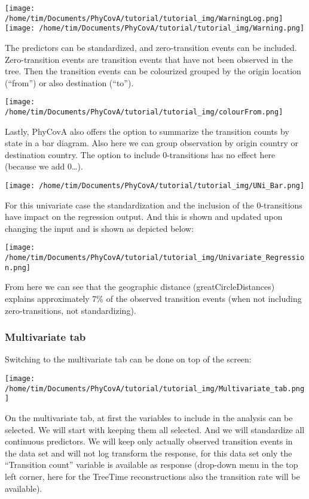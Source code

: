 \documentclass[
]{article}
\begin{document}
\texttt{[image: /home/tim/Documents/PhyCovA/tutorial/tutorial\_img/WarningLog.png]}
\texttt{[image: /home/tim/Documents/PhyCovA/tutorial/tutorial\_img/Warning.png]}

The predictors can be standardized, and zero-transition events can be
included. Zero-transition events are transition events that have not
been observed in the tree. Then the transition events can be colourized
grouped by the origin location (``from'') or also destination (``to'').

\texttt{[image: /home/tim/Documents/PhyCovA/tutorial/tutorial\_img/colourFrom.png]}

Lastly, PhyCovA also offers the option to summarize the transition
counts by state in a bar diagram. Also here we can group observation by
origin country or destination country. The option to include
0-transitions has no effect here (because we add 0\ldots).

\texttt{[image: /home/tim/Documents/PhyCovA/tutorial/tutorial\_img/UNi\_Bar.png]}

For this univariate case the standardization and the inclusion of the
0-transitions have impact on the regression output. And this is shown
and updated upon changing the input and is shown as depicted below:

\texttt{[image: /home/tim/Documents/PhyCovA/tutorial/tutorial\_img/Univariate\_Regression.png]}

From here we can see that the geographic distance (greatCircleDistances)
explains approximately 7\% of the observed transition events (when not
including zero-transitions, not standardizing).

\hypertarget{multivariate-tab}{%
\subsubsection{Multivariate tab}\label{multivariate-tab}}

Switching to the multivariate tab can be done on top of the screen:

\texttt{[image: /home/tim/Documents/PhyCovA/tutorial/tutorial\_img/Multivariate\_tab.png]}

On the multivariate tab, at first the variables to include in the
analysis can be selected. We will start with keeping them all selected.
And we will standardize all continuous predictors. We will keep only
actually observed transition events in the data set and will not log
transform the response, for this data set only the ``Transition count''
variable is available as response (drop-down menu in the top left
corner, here for the TreeTime reconstructions also the transition rate
will be available).
\end{document}
